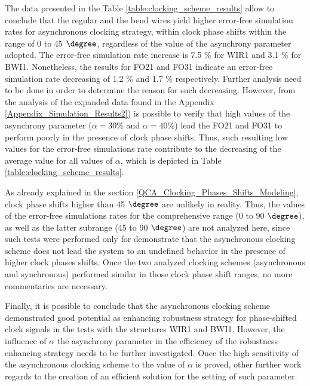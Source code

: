 The data presented in the Table \ref{table:clocking_scheme_results} allow to conclude that the regular and the bend wires yield higher error-free simulation rates for asynchronous clocking strategy, within clock phase shifts within the range of 0 to 45 $\degree$, regardless of the value of the asynchrony parameter adopted. The error-free simulation rate increase is 7.5 \% for WIR1 and 3.1 \% for BWI1. Nonetheless, the results for FO21 and FO31 indicate an error-free simulation rate decreasing of 1.2 \% and 1.7 \% respectively. Further analysis need to be done in order to determine the reason for such decreasing. However, from the analysis of the expanded data found in the Appendix \ref{Appendix_Simulation_Results2}) is possible to verify that high values of the asynchrony parameter ($\alpha = 30  \%$ and $\alpha = 40  \%$) lead the FO21 and FO31 to perform poorly in the presence of clock phase shifts. Thus, such resulting low values for the error-free simulations rate contribute to the decreasing of the average value for all values of $\alpha$, which is depicted in Table \ref{table:clocking_scheme_results}.

As already explained in the section \ref{QCA_Clocking_Phases_Shifts_Modeling}, clock phase shifts higher than 45 $\degree$ are unlikely in reality. Thus, the values of the error-free simulations rates for the comprehensive range (0 to 90 $\degree$), as well as the latter subrange (45 to 90 $\degree$) are not analyzed here, since such tests were performed only for demonstrate that the asynchronous clocking scheme does not lead the system to an undefined behavior in the presence of higher clock phases shifts. Once the two analyzed clocking schemes (asynchronous and synchronous) performed similar in those clock phase shift ranges, no more commentaries are necessary.

Finally, it is possible to conclude that the asynchronous clocking scheme demonstrated good potential as enhancing robustness strategy for phase-shifted clock signals in the tests with the structures WIR1 and BWI1. However, the influence of $\alpha$ \textemdash the asynchrony parameter \textemdash in the efficiency of the robustness enhancing strategy needs to be further investigated. Once the high sensitivity of the asynchronous clocking scheme to the value of $\alpha$ is proved, other further work regards to the creation of an efficient solution for the setting of such parameter.
